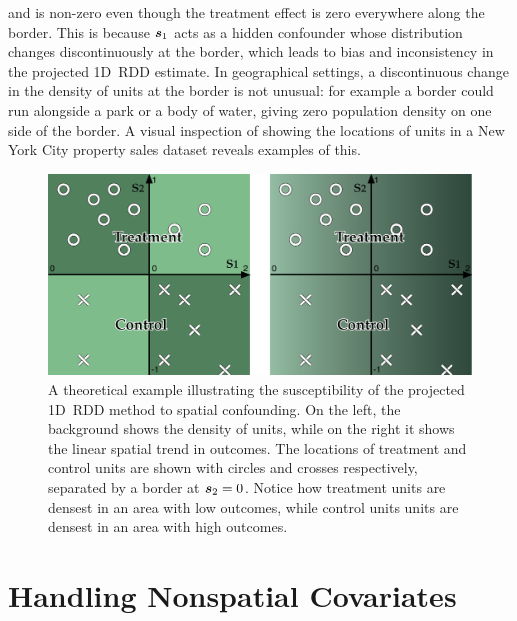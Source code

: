 and is non-zero even though the treatment effect is zero everywhere along the border.
This is because \(\bm{s}_1\) acts as a hidden confounder whose distribution changes discontinuously at the border, which leads to bias and inconsistency in the projected 1D~RDD estimate.
In geographical settings, a discontinuous change in the density of units at the border is not unusual: for example a border could run alongside a park or a body of water, giving zero population density on one side of the border.
A visual inspection of  showing the locations of units in a New York City property sales dataset reveals examples of this.

\begin{figure}[tb]
    \centering
    \includegraphics[height=0.3\textheight]{figures/confounding/confounding.pdf}
    \caption{
        A theoretical example illustrating the susceptibility of the projected 1D~RDD method to spatial confounding.
        On the left, the background shows the density of units, while on the right it shows the linear spatial trend in outcomes.
        The locations of treatment and control units are shown with circles and crosses respectively, separated by a border at \(\bm{s}_2 = 0\).
        Notice how treatment units are densest in an area with low outcomes, while control units units are densest in an area with high outcomes.
        \label{fig:confounding}}
\end{figure}

\section{Handling Nonspatial Covariates}
\label{sec:covariates}

